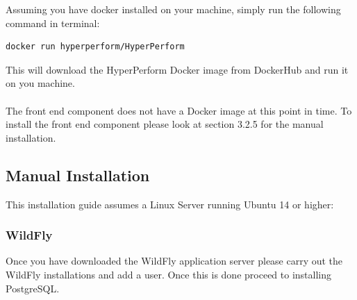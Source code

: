 \documentclass[11pt,a4paper]{article}
\begin{document}
Assuming you have docker installed on your machine, simply run the following command in terminal: 

\begin{lstlisting}[language=bash]
docker run hyperperform/HyperPerform 
\end{lstlisting}
This will download the HyperPerform Docker image from DockerHub and run it on you machine. \\ \\
The front end component does not have a Docker image at this point in time. To install the front end component please look at section 3.2.5 for the manual installation.

\subsection{Manual Installation}
This installation guide assumes a Linux Server running Ubuntu 14 or higher:

\subsubsection{WildFly}
Once you have downloaded the WildFly application server please carry out the WildFly installations and add a user. Once this is done proceed to installing PostgreSQL.

\end{document}

